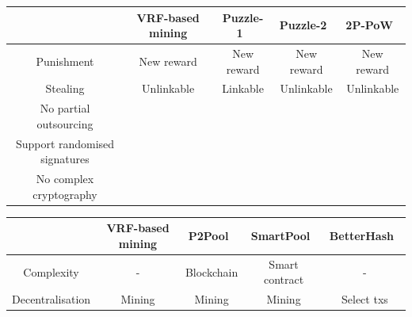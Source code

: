 \documentclass[a0,portrait]{a0poster}
\newcommand{\cmark}{\ding{51}}%
\newcommand{\xmark}{\ding{55}}%
\begin{document}
\begin{multicols}{2}
    \begin{center}
        \begin{tabular}{ccccc}
            \hline
                                          & VRF-based mining & Puzzle-1~\cite{miller2015nonoutsourceable} & Puzzle-2~\cite{miller2015nonoutsourceable} & 2P-PoW~\cite{2P-PoW} \\ \hline
            Punishment                    & New reward       & New reward                                 & New reward                                 & New reward           \\
            Stealing                      & Unlinkable       & Linkable                                   & Unlinkable                                 & Unlinkable           \\
            No partial outsourcing        & \cmark           & \cmark                                     & \cmark                                     & \xmark               \\
            Support randomised signatures & \cmark           & \cmark                                     & \cmark                                     & \xmark               \\
            No complex cryptography       & \cmark           & \cmark                                     & \xmark                                     & \cmark               \\ \hline
        \end{tabular}
    \end{center}

    \begin{center}
        \begin{tabular}{ccccc}
            \hline
                             & VRF-based mining & P2Pool~\cite{voight2011p2pool} & SmartPool~\cite{luu2017smartpool} & BetterHash~\cite{draft-bip-BetterHash} \\ \hline
            Complexity       & -                & Blockchain                     & Smart contract                    & -                                      \\
            Decentralisation & Mining           & Mining                         & Mining                            & Select txs                             \\ \hline
        \end{tabular}
    \end{center}



\end{multicols}
\end{document}
